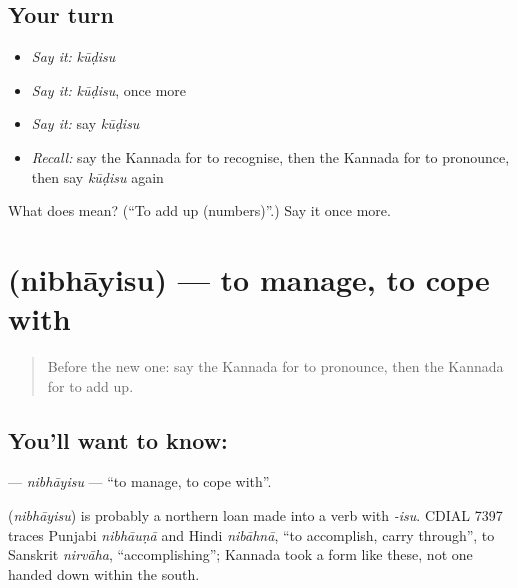 \subsection*{Your turn}
\begin{itemize}
\raggedright
  \item \emph{Say it:} \emph{kūḍisu}
  \item \emph{Say it:} \emph{kūḍisu}, once more
  \item \emph{Say it:} say \emph{kūḍisu}
  \item \emph{Recall:} say the Kannada for to recognise, then the Kannada for to pronounce, then say \emph{kūḍisu} again
\end{itemize}

\begin{tcolorbox}[breakable,colback=teal!4,colframe=teal!35!black,title={Before you move on}]
What does  mean? (\textquotedblleft{}To add up (numbers)\textquotedblright{}.) Say it once more.
\end{tcolorbox}
\section[\texorpdfstring{\kn{ನಿಭಾಯಿಸು} (nibhāyisu)}{ನಿಭಾಯಿಸು (nibhāyisu)}]{ (nibhāyisu) — to manage, to cope with}

\label{lesson:KA-C243-nibhayisu}



\begin{quote}
Before the new one: say the Kannada for to pronounce, then the Kannada for to add up.
\end{quote}

\subsection*{You'll want to know: }
\textbf{} — \emph{nibhāyisu} — \textquotedblleft{}to manage, to cope with\textquotedblright{}.

\begin{cousinweb}
\textbf{} (\emph{nibhāyisu}) is probably a northern loan made into a verb with \emph{-isu}. CDIAL 7397 traces Punjabi \emph{nibhāuṇā} and Hindi \emph{nibāhnā}, \textquotedblleft{}to accomplish, carry through\textquotedblright{}, to Sanskrit \emph{nirvāha}, \textquotedblleft{}accomplishing\textquotedblright{}; Kannada took a form like these, not one handed down within the south.
\end{cousinweb}

